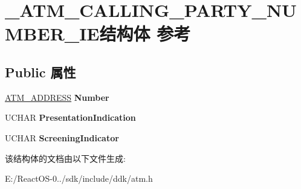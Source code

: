 \hypertarget{struct___a_t_m___c_a_l_l_i_n_g___p_a_r_t_y___n_u_m_b_e_r___i_e}{}\section{\+\_\+\+A\+T\+M\+\_\+\+C\+A\+L\+L\+I\+N\+G\+\_\+\+P\+A\+R\+T\+Y\+\_\+\+N\+U\+M\+B\+E\+R\+\_\+\+I\+E结构体 参考}
\label{struct___a_t_m___c_a_l_l_i_n_g___p_a_r_t_y___n_u_m_b_e_r___i_e}
\subsection*{Public 属性}
\begin{DoxyCompactItemize}
\item 
\mbox{\label{struct___a_t_m___c_a_l_l_i_n_g___p_a_r_t_y___n_u_m_b_e_r___i_e_acacfa7909f3c9735aa2e8e90b3f99592}} 
\hyperlink{struct_a_t_m___a_d_d_r_e_s_s}{A\+T\+M\+\_\+\+A\+D\+D\+R\+E\+SS} {\bfseries Number}
\item 
\mbox{\label{struct___a_t_m___c_a_l_l_i_n_g___p_a_r_t_y___n_u_m_b_e_r___i_e_a76cfc5c038cf3096c667d475dc4fe978}} 
U\+C\+H\+AR {\bfseries Presentation\+Indication}
\item 
\mbox{\label{struct___a_t_m___c_a_l_l_i_n_g___p_a_r_t_y___n_u_m_b_e_r___i_e_a275f4137575bd53ceb7ce86fd972f8f4}} 
U\+C\+H\+AR {\bfseries Screening\+Indicator}
\end{DoxyCompactItemize}


该结构体的文档由以下文件生成\+:\begin{DoxyCompactItemize}
\item 
E\+:/\+React\+O\+S-\/0../sdk/include/ddk/atm.\+h\end{DoxyCompactItemize}
